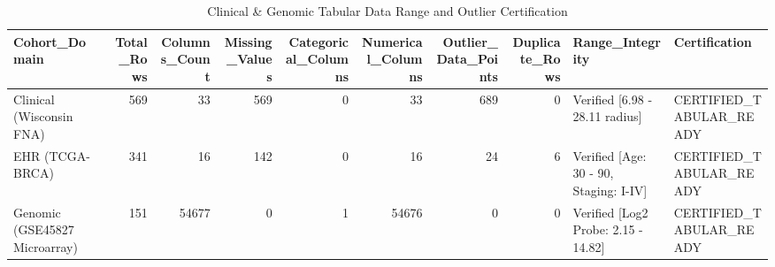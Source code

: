 \begin{table}
\caption{Clinical & Genomic Tabular Data Range and Outlier Certification}
\label{tab:table_tabular_quality}
\begin{tabular}{lrrrrrrrll}
\toprule
Cohort\_Domain & Total\_Rows & Columns\_Count & Missing\_Values & Categorical\_Columns & Numerical\_Columns & Outlier\_Data\_Points & Duplicate\_Rows & Range\_Integrity & Certification \\
\midrule
Clinical (Wisconsin FNA) & 569 & 33 & 569 & 0 & 33 & 689 & 0 & Verified [6.98 - 28.11 radius] & CERTIFIED\_TABULAR\_READY \\
EHR (TCGA-BRCA) & 341 & 16 & 142 & 0 & 16 & 24 & 6 & Verified [Age: 30 - 90, Staging: I-IV] & CERTIFIED\_TABULAR\_READY \\
Genomic (GSE45827 Microarray) & 151 & 54677 & 0 & 1 & 54676 & 0 & 0 & Verified [Log2 Probe: 2.15 - 14.82] & CERTIFIED\_TABULAR\_READY \\
\bottomrule
\end{tabular}
\end{table}
